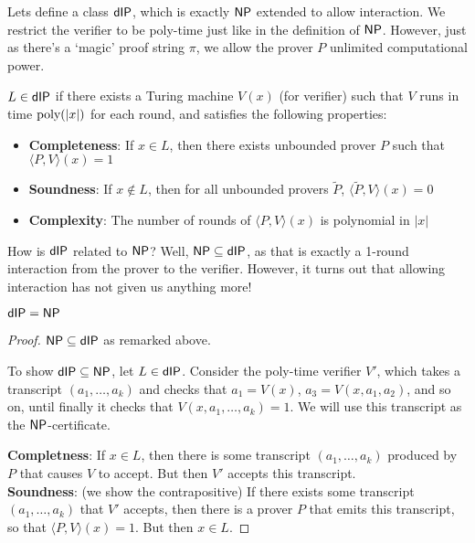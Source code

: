 \documentclass{article}
\begin{document}
Lets define a class $\mathsf{dIP}$, which is exactly $\mathsf{NP}$ extended to allow interaction.
We restrict the verifier to be poly-time just like in the definition of $\mathsf{NP}$.
However, just as there's a `magic' proof string $\pi$, we allow the prover $P$ unlimited computational power.

\begin{definition}
    $L \in \mathsf{dIP}$ if there exists a Turing machine $V(x)$ (for verifier) such that
    $V$ runs in time $\operatorname*{\textup{poly}}(|x|)$ for each round, and satisfies the following properties:
    \begin{itemize}
        \item \textbf{Completeness}: If $x \in L$, then there exists unbounded prover $P$ such that $\langle P, V \rangle(x) = 1$
        \item \textbf{Soundness}: If $x \notin L$, then for all unbounded provers $\tilde{P}$, $\langle \tilde{P}, V \rangle(x) = 0$
        \item \textbf{Complexity}: The number of rounds of $\langle P, V \rangle(x)$ is polynomial in $|x|$
    \end{itemize}
\end{definition}

How is $\mathsf{dIP}$ related to $\mathsf{NP}$? Well, $\mathsf{NP} \subseteq \mathsf{dIP}$, as that is exactly a 1-round interaction from the prover to the verifier.
However, it turns out that allowing interaction has not given us anything more!

\begin{claim} $\mathsf{dIP} = \mathsf{NP}$\end{claim}
\begin{proof}
    $\mathsf{NP} \subseteq \mathsf{dIP}$ as remarked above.

    To show $\mathsf{dIP} \subseteq \mathsf{NP}$, let $L \in \mathsf{dIP}$.
    Consider the poly-time verifier $V'$, which takes a transcript $(a_1, \ldots, a_k)$ and checks that
    $a_1 = V(x)$, $a_3 = V(x, a_1, a_2)$, and so on, until finally it checks that $V(x, a_1, \ldots, a_k) = 1$. 
    We will use this transcript as the $\mathsf{NP}$-certificate.

    \textbf{Completness}: If $x \in L$, then there is some transcript $(a_1, \ldots, a_k)$ produced by $P$ that causes $V$ to accept.
    But then $V'$ accepts this transcript. \\
    \textbf{Soundness}: (we show the contrapositive) If there exists some transcript $(a_1, \ldots, a_k)$ that $V'$ accepts, then there is a prover $P$ that emits this transcript, so that $\langle P, V \rangle(x) = 1$. But then $x \in L$.
\end{proof}
\end{document}
